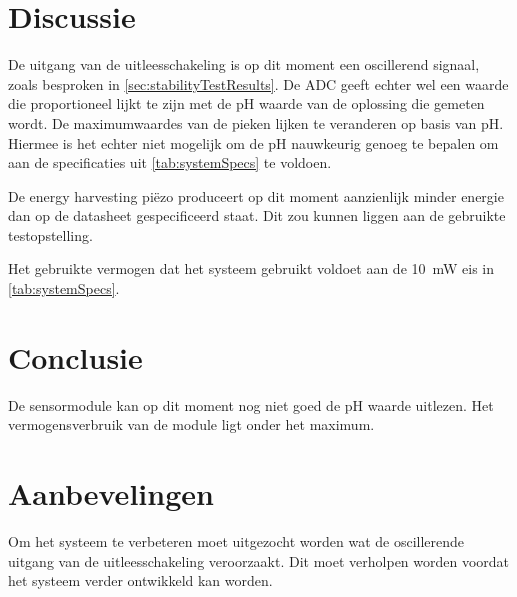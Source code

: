 \section{Discussie}
De uitgang van de uitleesschakeling is op dit moment een oscillerend signaal, zoals besproken in \cref{sec:stabilityTestResults}. De ADC geeft echter wel een waarde die proportioneel lijkt te zijn met de pH waarde van de oplossing die gemeten wordt.
De maximumwaardes van de pieken lijken te veranderen op basis van pH. Hiermee is het echter niet mogelijk om de pH nauwkeurig genoeg te bepalen om aan de specificaties uit \cref{tab:systemSpecs} te voldoen.

De energy harvesting piëzo produceert op dit moment aanzienlijk minder energie dan op de datasheet gespecificeerd staat. Dit zou kunnen liggen aan de gebruikte testopstelling.

Het gebruikte vermogen dat het systeem gebruikt voldoet aan de \qty{10}{\milli\watt} eis in \cref{tab:systemSpecs}.

\newpage
\section{Conclusie}
De sensormodule kan op dit moment nog niet goed de pH waarde uitlezen. Het vermogensverbruik van de module ligt onder het maximum.


\newpage
\section{Aanbevelingen}
Om het systeem te verbeteren moet uitgezocht worden wat de oscillerende uitgang van de uitleesschakeling veroorzaakt. Dit moet verholpen worden voordat het systeem verder ontwikkeld kan worden. 


